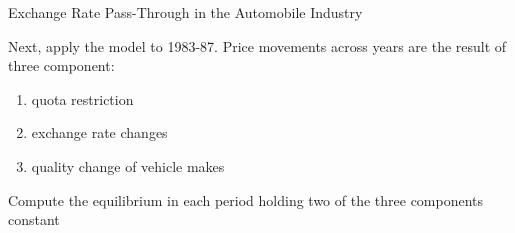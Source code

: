 \documentclass{beamer}
\begin{document}
\begin{frame}{Exchange Rate Pass-Through in the Automobile Industry}

   Next, apply the model to 1983-87. Price movements across years are the result of three component:

   \begin{enumerate}
	\item quota restriction
	\item exchange rate changes
	\item quality change of vehicle makes

   \end{enumerate}

   Compute the equilibrium in each period holding two of the three components
   constant


\end{frame}
\end{document}
